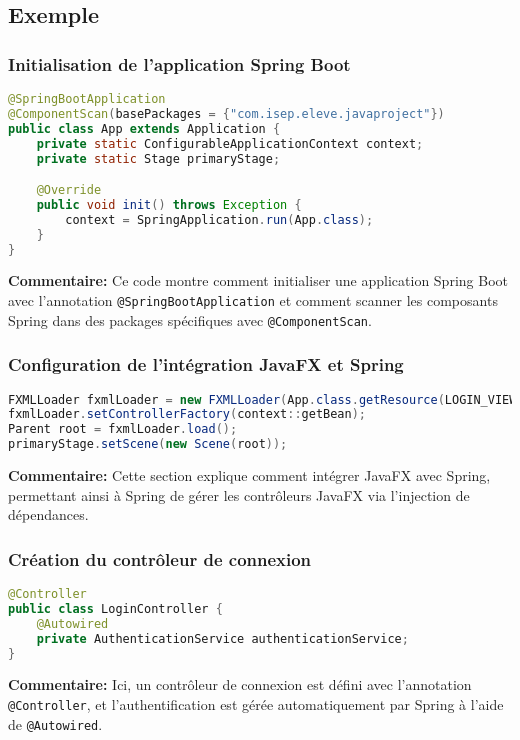 \documentclass{article}
\begin{document}
\subsection{Exemple}

\subsubsection{Initialisation de l'application Spring Boot}
\begin{lstlisting}[language=Java]
@SpringBootApplication
@ComponentScan(basePackages = {"com.isep.eleve.javaproject"})
public class App extends Application {
    private static ConfigurableApplicationContext context;
    private static Stage primaryStage;

    @Override
    public void init() throws Exception {
        context = SpringApplication.run(App.class);
    }
}
\end{lstlisting}
\textbf{Commentaire:} Ce code montre comment initialiser une application Spring Boot avec l'annotation \texttt{@SpringBootApplication} et comment scanner les composants Spring dans des packages spécifiques avec \texttt{@ComponentScan}.

\subsubsection{Configuration de l'intégration JavaFX et Spring}
\begin{lstlisting}[language=Java]
FXMLLoader fxmlLoader = new FXMLLoader(App.class.getResource(LOGIN_VIEW_PATH));
fxmlLoader.setControllerFactory(context::getBean);
Parent root = fxmlLoader.load();
primaryStage.setScene(new Scene(root));
\end{lstlisting}
\textbf{Commentaire:} Cette section explique comment intégrer JavaFX avec Spring, permettant ainsi à Spring de gérer les contrôleurs JavaFX via l'injection de dépendances.

\subsubsection{Création du contrôleur de connexion}
\begin{lstlisting}[language=Java]
@Controller
public class LoginController {
    @Autowired
    private AuthenticationService authenticationService;
}
\end{lstlisting}
\textbf{Commentaire:} Ici, un contrôleur de connexion est défini avec l'annotation \texttt{@Controller}, et l'authentification est gérée automatiquement par Spring à l'aide de \texttt{@Autowired}.
\end{document}
